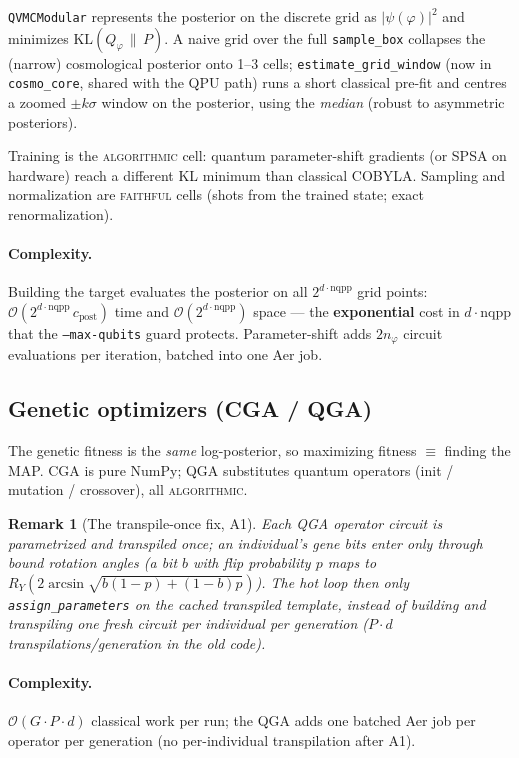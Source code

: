 \documentclass[11pt]{article}
\newtheorem{remark}{Remark}[section]
\newcommand{\code}[1]{\texttt{#1}}
\newcommand{\bigO}{\mathcal{O}}
\newcommand{\KL}{\mathrm{KL}}
\newcommand{\faithful}{\textsc{faithful}}
\newcommand{\algorithmic}{\textsc{algorithmic}}
\begin{document}
\code{QVMCModular} represents the posterior on the discrete grid as
$|\psi(\varphi)|^2$ and minimizes $\KL(Q_\varphi\,\|\,P)$. A naive grid over
the full \code{sample\_box} collapses the (narrow) cosmological posterior onto
1--3 cells; \code{estimate\_grid\_window} (now in \code{cosmo\_core}, shared
with the QPU path) runs a short classical pre-fit and centres a zoomed
$\pm k\sigma$ window on the posterior, using the \emph{median} (robust to
asymmetric posteriors).

Training is the \algorithmic{} cell: quantum parameter-shift gradients (or
SPSA on hardware) reach a different KL minimum than classical COBYLA. Sampling
and normalization are \faithful{} cells (shots from the trained state; exact
renormalization).

\paragraph{Complexity.}
Building the target evaluates the posterior on all $2^{d\cdot\mathrm{nqpp}}$
grid points: $\bigO(2^{d\cdot\mathrm{nqpp}}\,c_{\mathrm{post}})$ time and
$\bigO(2^{d\cdot\mathrm{nqpp}})$ space --- the \textbf{exponential} cost in
$d\cdot\mathrm{nqpp}$ that the \code{--max-qubits} guard protects.
Parameter-shift adds $2n_\varphi$ circuit evaluations per iteration, batched
into one Aer job.

\subsection{Genetic optimizers (CGA / QGA)}
\label{sec:genetic}

The genetic fitness is the \emph{same} log-posterior, so maximizing fitness
$\equiv$ finding the MAP. CGA is pure NumPy; QGA substitutes quantum operators
(init / mutation / crossover), all \algorithmic{}. 

\begin{remark}[The transpile-once fix, A1]
Each QGA operator circuit is \emph{parametrized} and transpiled once; an
individual's gene bits enter only through bound rotation angles (a bit $b$ with
flip probability $p$ maps to $R_Y(2\arcsin\sqrt{b(1{-}p)+(1{-}b)p})$). The hot
loop then only \code{assign\_parameters} on the cached transpiled template,
instead of building and transpiling one fresh circuit per individual per
generation ($P\!\cdot\!d$ transpilations/generation in the old code).
\end{remark}

\paragraph{Complexity.}
$\bigO(G\cdot P\cdot d)$ classical work per run; the QGA adds one batched Aer
job per operator per generation (no per-individual transpilation after A1).
\end{document}
